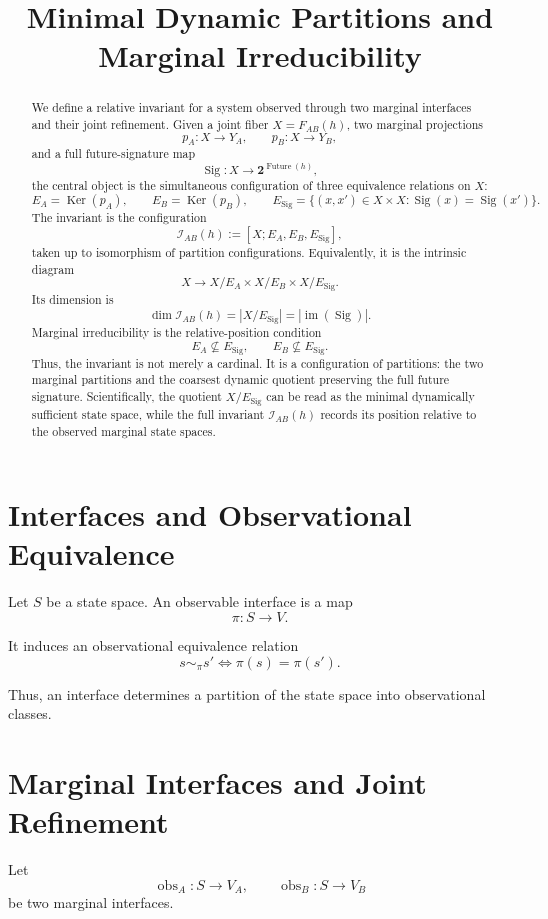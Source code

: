 \documentclass[11pt]{article}
\title{Minimal Dynamic Partitions and Marginal Irreducibility}
\author{}
\date{}
\newcommand{\Obs}{\operatorname{obs}}
\newcommand{\Future}{\operatorname{Future}}
\newcommand{\Sig}{\operatorname{Sig}}
\newcommand{\im}{\operatorname{im}}
\newcommand{\Ker}{\operatorname{Ker}}
\newcommand{\two}{\mathbf{2}}
\begin{document}
\maketitle

\begin{abstract}
We define a relative invariant for a system observed through two marginal interfaces and their joint refinement.
Given a joint fiber \(X=F_{AB}(h)\), two marginal projections
\[
p_A:X\to Y_A,
\qquad
p_B:X\to Y_B,
\]
and a full future-signature map
\[
\Sig:X\to \two^{\Future(h)},
\]
the central object is the simultaneous configuration of three equivalence relations on \(X\):
\[
E_A=\Ker(p_A),
\qquad
E_B=\Ker(p_B),
\qquad
E_\Sig=\{(x,x')\in X\times X:\Sig(x)=\Sig(x')\}.
\]
The invariant is the configuration
\[
\mathcal I_{AB}(h):=[X;E_A,E_B,E_\Sig],
\]
taken up to isomorphism of partition configurations.
Equivalently, it is the intrinsic diagram
\[
X\longrightarrow X/E_A\times X/E_B\times X/E_\Sig.
\]
Its dimension is
\[
\dim \mathcal I_{AB}(h)=|X/E_\Sig|=|\im(\Sig)|.
\]
Marginal irreducibility is the relative-position condition
\[
E_A\nsubseteq E_\Sig,
\qquad
E_B\nsubseteq E_\Sig.
\]
Thus, the invariant is not merely a cardinal. It is a configuration of partitions: the two marginal partitions and the coarsest dynamic quotient preserving the full future signature.
Scientifically, the quotient \(X/E_\Sig\) can be read as the minimal dynamically sufficient state space, while the full invariant \(\mathcal I_{AB}(h)\) records its position relative to the observed marginal state spaces.
\end{abstract}

\section{Interfaces and Observational Equivalence}

Let \(S\) be a state space. An observable interface is a map
\[
\pi:S\to V.
\]

It induces an observational equivalence relation
\[
s\sim_\pi s'
\iff
\pi(s)=\pi(s').
\]

Thus, an interface determines a partition of the state space into observational classes.

\section{Marginal Interfaces and Joint Refinement}

Let
\[
\Obs_A:S\to V_A,
\qquad
\Obs_B:S\to V_B
\]
be two marginal interfaces.
\end{document}
